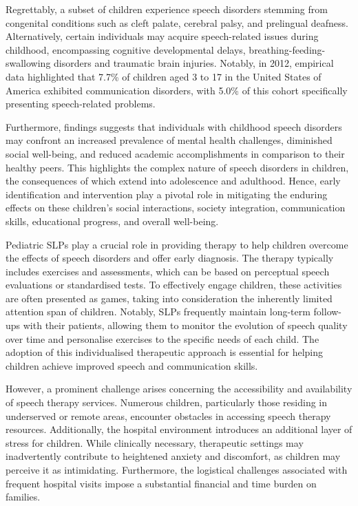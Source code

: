 Regrettably, a subset of children experience speech disorders stemming from congenital conditions such as cleft palate, cerebral palsy, and prelingual deafness. Alternatively, certain individuals may acquire speech-related issues during childhood, encompassing cognitive developmental delays, breathing-feeding-swallowing disorders and traumatic brain injuries. Notably, in 2012, empirical data \cite{black2015communication} highlighted that 7.7\% of children aged 3 to 17 in the United States of America exhibited communication disorders, with 5.0\% of this cohort specifically presenting speech-related problems.

Furthermore, findings \cite{langbecker2020long} suggests that individuals with childhood speech disorders may confront an increased prevalence of mental health challenges, diminished social well-being, and reduced academic accomplishments in comparison to their healthy peers. This highlights the complex nature of speech disorders in children, the consequences of which extend into adolescence and adulthood. Hence, early identification and intervention play a pivotal role in mitigating the enduring effects on these children's social interactions, society integration, communication skills, educational progress, and overall well-being.

Pediatric \acp{SLP} play a crucial role in providing therapy to help children overcome the effects of speech disorders and offer early diagnosis. The therapy typically includes exercises and assessments, which can be based on perceptual speech evaluations or standardised tests. To effectively engage children, these activities are often presented as games, taking into consideration the inherently limited attention span of children. Notably, \acp{SLP} frequently maintain long-term follow-ups with their patients, allowing them to monitor the evolution of speech quality over time and personalise exercises to the specific needs of each child. The adoption of this individualised therapeutic approach is essential for helping children achieve improved speech and communication skills.

However, a prominent challenge arises concerning the accessibility and availability of speech therapy services. Numerous children, particularly those residing in underserved or remote areas, encounter obstacles in accessing speech therapy resources. Additionally, the hospital environment introduces an additional layer of stress for children. While clinically necessary, therapeutic settings may inadvertently contribute to heightened anxiety and discomfort, as children may perceive it as intimidating. Furthermore, the logistical challenges associated with frequent hospital visits impose a substantial financial and time burden on families.

